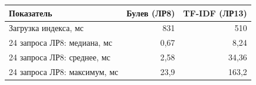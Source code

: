 \begin{tabular}{|p{}|r|r|}
\hline
Показатель & Булев (ЛР8) & TF-IDF (ЛР13) \\
\hline
Загрузка индекса, мс & 831 & 510 \\
\hline
24 запроса ЛР8: медиана, мс & 0,67 & 8,24 \\
\hline
24 запроса ЛР8: среднее, мс & 2,58 & 34,36 \\
\hline
24 запроса ЛР8: максимум, мс & 23,9 & 163,2 \\
\hline
\end{tabular}
